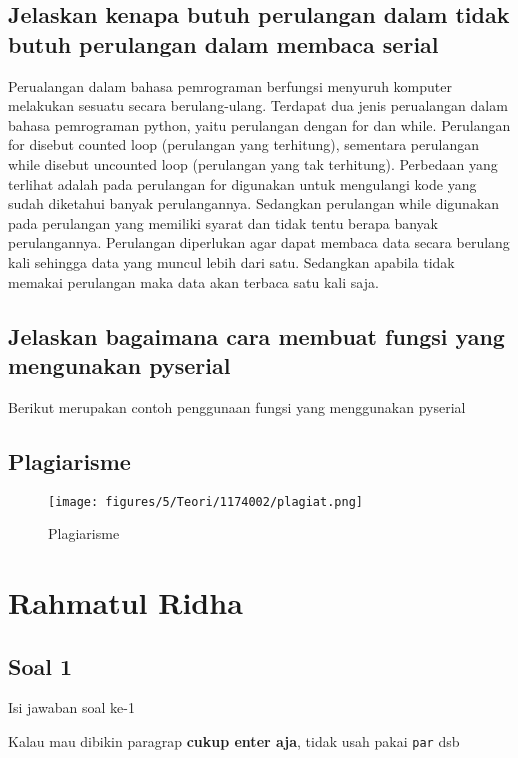 \subsection{Jelaskan kenapa butuh perulangan dalam tidak butuh perulangan dalam membaca serial}
Perualangan dalam bahasa pemrograman berfungsi menyuruh komputer melakukan sesuatu secara berulang-ulang. Terdapat dua jenis perualangan dalam bahasa pemrograman python, yaitu perulangan dengan for dan while.
Perulangan for disebut counted loop (perulangan yang terhitung), sementara perulangan while disebut uncounted loop (perulangan yang tak terhitung). Perbedaan yang terlihat adalah pada perulangan for digunakan untuk mengulangi kode yang sudah diketahui banyak perulangannya. Sedangkan perulangan while digunakan pada perulangan yang memiliki syarat dan tidak tentu berapa banyak perulangannya.
Perulangan diperlukan agar dapat membaca data secara berulang kali sehingga data yang muncul lebih dari satu.  Sedangkan apabila tidak memakai perulangan maka data akan terbaca satu kali saja.

\subsection{Jelaskan bagaimana cara membuat fungsi yang mengunakan pyserial}
Berikut merupakan contoh penggunaan fungsi yang menggunakan pyserial


\subsection{Plagiarisme}
\begin{figure}[h]
\centering
\texttt{[image: figures/5/Teori/1174002/plagiat.png]}
\caption{Plagiarisme}
\label{fig:plagiat}
\end{figure}

\section{Rahmatul Ridha}
\subsection{Soal 1}
Isi jawaban soal ke-1

Kalau mau dibikin paragrap \textbf{cukup enter aja}, tidak usah pakai \verb|par| dsb


